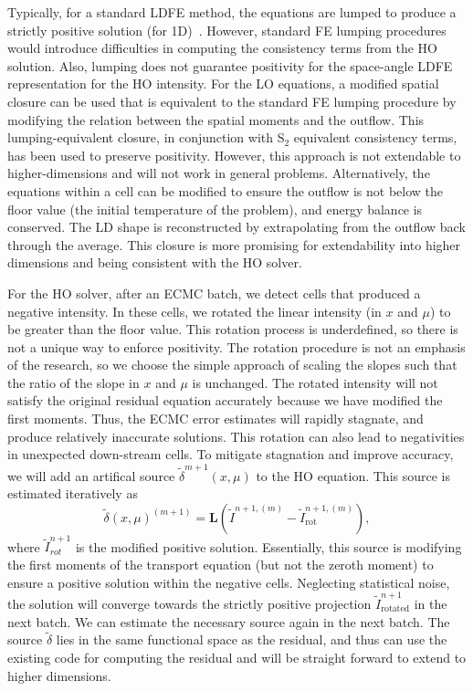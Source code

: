 \documentclass[11pt]{article}
\begin{document}
Typically, for a standard LDFE method,
the equations are lumped to produce a strictly positive solution (for 1D)~\cite{morel_newton}. However, standard FE lumping
procedures would introduce difficulties in computing the consistency terms from the
HO solution.  Also, lumping does not guarantee positivity for the space-angle LDFE
representation for the HO intensity.  For the LO equations, a modified spatial closure can be used that is equivalent to the
standard FE lumping procedure by modifying the relation between the spatial moments and
the outflow.  This lumping-equivalent closure, in conjunction with S$_2$ equivalent consistency
terms, has been used to preserve positivity.  However, this approach is not
extendable to higher-dimensions and will not work in general problems.
Alternatively, the equations within a cell can be modified to ensure the outflow is not
below the floor value (the initial temperature of the problem), and energy balance is
conserved.  The LD shape is reconstructed by extrapolating from the outflow back
through the average.  This closure is more promising for extendability into higher
dimensions and being consistent with the HO solver.

For the HO solver, after an ECMC batch, we detect cells that produced a negative
intensity. In these cells, we rotated the linear intensity (in $x$ and $\mu$) to be greater than the floor
value.  This rotation process is underdefined, so there is not a unique way to enforce
positivity.  The rotation procedure is not an emphasis of the research, so we choose the simple
approach of scaling the slopes such that the ratio of the slope in $x$ and $\mu$ is unchanged.  The rotated
intensity will not satisfy the original residual equation accurately because we have
modified the first moments.   Thus, the ECMC error estimates will rapidly stagnate,
and produce relatively inaccurate solutions.  This rotation can also lead to
negativities in unexpected down-stream cells.  To mitigate
stagnation and improve accuracy, we will add an artifical source $\tilde\delta^{m+1}(x,\mu)$ to the HO equation.
This source is estimated iteratively as
\begin{equation*}
    \tilde\delta(x,\mu)^{(m+1)} = \mathbf{L}(\tilde{I}^{n+1,(m)} -
    \tilde{I}^{n+1,(m)}_{\text{rot}}),
\end{equation*}
where $\tilde{I}_{rot}^{n+1}$ is the modified positive solution.
Essentially, this source is modifying the first moments of the transport equation (but not the
zeroth moment) to ensure a positive solution within the negative cells.  Neglecting
statistical noise, the solution will converge towards the strictly positive projection
$\tilde{I}_{\text{rotated}}^{n+1}$ in the next batch. We can estimate the necessary source again in the next batch.  The source
$\tilde\delta$ lies in the same functional space as the residual, and thus can use
the existing code for computing the residual and will be straight forward to extend
to higher dimensions.  
\end{document}
